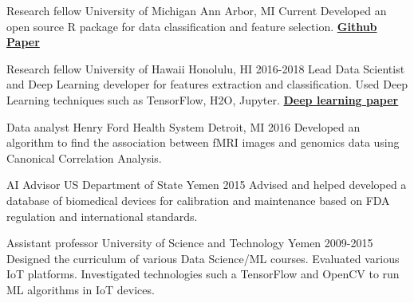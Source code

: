 \begin{cventries}

  \cventry
    {Research fellow}
    {University of Michigan}
    {Ann Arbor, MI}
    {Current}
    {
 Developed an open source R package for data classification and feature selection. \href{https://github.com/FADHLyemen/lilikoi_summary}{\textbf{Github}}
 \href{https://academic.oup.com/gigascience/article/7/12/giy136/5237705}{\textbf{Paper}}
    }

  \cventry
    {Research fellow}
    {University of Hawaii}
    {Honolulu, HI}
    {2016-2018}
    {
     Lead Data Scientist and Deep Learning developer for features extraction and classification. Used
    Deep Learning techniques such as TensorFlow, H2O, Jupyter.
    \href{ https://www.ncbi.nlm.nih.gov/pubmed/29110491}{\textbf{Deep learning paper}}
    }

  \cventry
    {Data analyst}
    {Henry Ford Health System}
    {Detroit, MI}
    {2016}
    {
      Developed an algorithm to find the association between fMRI images and genomics data using Canonical Correlation Analysis. 
    }

  \cventry
    {AI Advisor}
    {US Department of State}
    {Yemen}
    {2015}
    {
    Advised and helped developed a database of biomedical devices for calibration and maintenance based on FDA regulation and international standards.
    }

  \cventry
    {Assistant professor}
    {University of Science and Technology}
    {Yemen}
    {2009-2015}
    {
    Designed the curriculum of various
    Data Science/ML courses. Evaluated various IoT platforms. Investigated
    technologies such a TensorFlow and OpenCV to run ML algorithms in IoT
    devices.
    }
\end{cventries}


